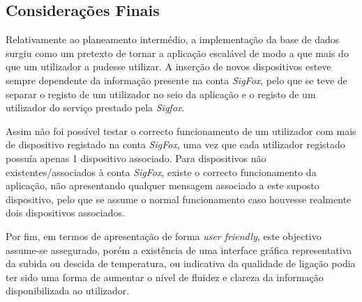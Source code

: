 \documentclass[a4paper]{article}
\begin{document}
\pagebreak
\subsection{Considerações Finais}

Relativamente ao planeamento intermédio, a implementação da base de dados surgiu como um pretexto de tornar a aplicação escalável de modo a que mais do que um utilizador a pudesse utilizar. 
A inserção de novos dispositivos esteve sempre dependente da informação presente na conta \textit{SigFox}, pelo que se teve de separar o registo de um utilizador no seio da aplicação e o registo de um utilizador do serviço prestado pela \textit{Sigfox}.

Assim não foi possível testar o correcto funcionamento de um utilizador com mais de dispositivo registado na conta \textit{SigFox}, uma vez que cada utilizador registado possuía apenas 1 dispositivo associado. Para dispositivos não existentes/associados à conta \textit{SigFox}, existe o correcto funcionamento da aplicação, não apresentando qualquer mensagem associado a este suposto dispositivo, pelo que se assume o normal funcionamento caso houvesse realmente dois dispositivos associados.

Por fim, em termos de apresentação de forma \textit{user friendly}, este objectivo assume-se assegurado, porém a existência de uma interface gráfica representativa da subida ou descida de temperatura, ou indicativa da qualidade de ligação podia ter sido uma forma de aumentar o nível de fluidez e clareza da informação disponibilizada ao utilizador.
\end{document}
